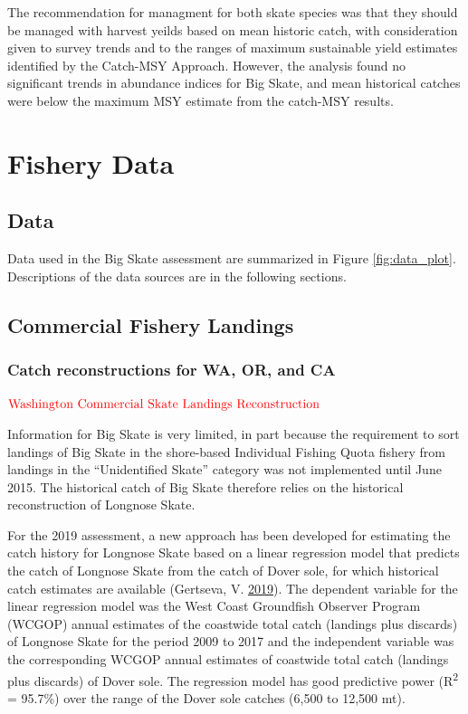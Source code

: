 \documentclass[12pt,]{article}
\begin{document}
The recommendation for managment for both skate species was that they
should be managed with harvest yeilds based on mean historic catch, with
consideration given to survey trends and to the ranges of maximum
sustainable yield estimates identified by the Catch-MSY Approach.
However, the analysis found no significant trends in abundance indices
for Big Skate, and mean historical catches were below the maximum MSY
estimate from the catch-MSY results.

\newpage

\hypertarget{fishery-data}{%
\section{Fishery Data}\label{fishery-data}}

\hypertarget{data}{%
\subsection{Data}\label{data}}

Data used in the Big Skate assessment are summarized in Figure
\ref{fig:data_plot}. Descriptions of the data sources are in the
following sections.

\hypertarget{commercial-fishery-landings}{%
\subsection{Commercial Fishery
Landings}\label{commercial-fishery-landings}}

\hypertarget{catch-reconstructions-for-wa-or-and-ca}{%
\subsubsection{Catch reconstructions for WA, OR, and
CA}\label{catch-reconstructions-for-wa-or-and-ca}}

\textbf{\(\color{red}{\text{Washington Commercial Skate Landings Reconstruction}}\)}

Information for Big Skate is very limited, in part because the
requirement to sort landings of Big Skate in the shore-based Individual
Fishing Quota fishery from landings in the ``Unidentified Skate''
category was not implemented until June 2015. The historical catch of
Big Skate therefore relies on the historical reconstruction of Longnose
Skate.

For the 2019 assessment, a new approach has been developed for
estimating the catch history for Longnose Skate based on a linear
regression model that predicts the catch of Longnose Skate from the
catch of Dover sole, for which historical catch estimates are available
(Gertseva, V. \protect\hyperlink{ref-Gertseva2019}{2019}). The dependent
variable for the linear regression model was the West Coast Groundfish
Observer Program (WCGOP) annual estimates of the coastwide total catch
(landings plus discards) of Longnose Skate for the period 2009 to 2017
and the independent variable was the corresponding WCGOP annual
estimates of coastwide total catch (landings plus discards) of Dover
sole. The regression model has good predictive power
(R\textsuperscript{2} = 95.7\%) over the range of the Dover sole catches
(6,500 to 12,500 mt).
\end{document}
